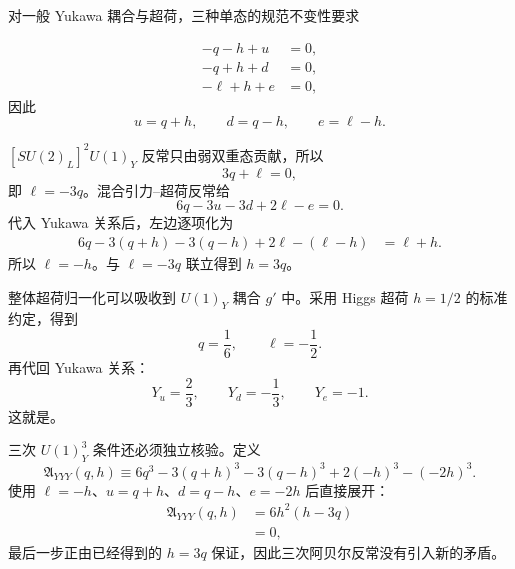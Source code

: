\begin{derivation}
对一般 Yukawa 耦合与超荷，三种单态的规范不变性要求

\begin{align*}
 -q-h+u&=0,\\
 -q+h+d&=0,\\
 -\ell+h+e&=0,
\end{align*}
因此
\begin{equation*}
 u=q+h,\qquad d=q-h,\qquad e=\ell-h.
\end{equation*}

$[SU(2)_L]^2U(1)_Y$ 反常只由弱双重态贡献，所以
\begin{equation*}
 3q+\ell=0,
\end{equation*}
即 $\ell=-3q$。混合引力--超荷反常给
\begin{equation*}
 6q-3u-3d+2\ell-e=0.
\end{equation*}
代入 Yukawa 关系后，左边逐项化为
\begin{align*}
 6q-3(q+h)-3(q-h)+2\ell-(\ell-h)
 &=\ell+h.
\end{align*}
所以 $\ell=-h$。与 $\ell=-3q$ 联立得到 $h=3q$。

整体超荷归一化可以吸收到 $U(1)_Y$ 耦合 $g'$ 中。采用 Higgs 超荷 $h=1/2$ 的标准约定，得到
\begin{equation*}
 q=\frac16,\qquad \ell=-\frac12.
\end{equation*}
再代回 Yukawa 关系：
\begin{equation*}
 Y_u=\frac23,\qquad
 Y_d=-\frac13,\qquad
 Y_e=-1.
\end{equation*}
这就是。

三次 $U(1)_Y^3$ 条件还必须独立核验。定义
\begin{equation*}
 \mathfrak A_{YYY}(q,h)
 \equiv
 6q^3-3(q+h)^3-3(q-h)^3+2(-h)^3-(-2h)^3.
\end{equation*}
使用 $\ell=-h$、$u=q+h$、$d=q-h$、$e=-2h$ 后直接展开：
\begin{align*}
 \mathfrak A_{YYY}(q,h)
 &=6h^2(h-3q)\\
 &=0,
\end{align*}
最后一步正由已经得到的 $h=3q$ 保证，因此三次阿贝尔反常没有引入新的矛盾。
\end{derivation}
